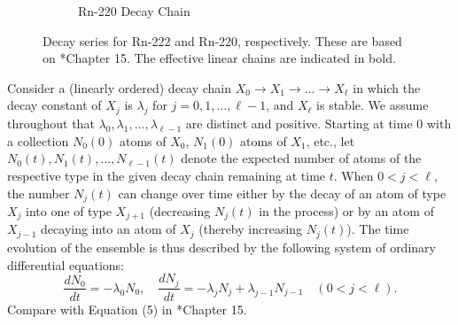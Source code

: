 \documentclass[11pt]{m2pi}
\begin{document}
\begin{figure}[h]
\begin{subfigure}[c]{0.49\textwidth}
{
}
            \caption[]%
            {{\tiny Rn-220 Decay Chain}}    
            \label{fig:ThoriumChain}
        \end{subfigure}
        \caption[ Decay Chains of Isotopes ]
        {\tiny Decay series for Rn-222 and Rn-220, respectively. These are based on \cite{Leighton}*{Chapter 15}. The effective linear chains are indicated in bold. } 
        \label{fig:DecayChains}
\end{figure}

\vspace*{-0.1cm}
Consider a (linearly ordered) decay chain $X_0\to X_1\to \ldots \to X_\ell$ in which the decay constant of $X_j$ is $\lambda_j$ for $j=0,1,\ldots,\ell-1$, and $X_\ell$ is stable.
We assume throughout that $\lambda_0,\lambda_1,\ldots,\lambda_{\ell-1}$ are distinct and positive.
Starting at time $0$ with a collection $N_0(0)$ atoms of $X_0$, $N_1(0)$ atoms of $X_1$, etc.,
let $N_0(t),N_1(t),\ldots,N_{\ell-1}(t)$ denote the expected number of atoms of the respective type in the given decay chain remaining at time $t$.
When $0<j < \ell$, the number $N_j(t)$ can change over time either by the decay of an atom of type $X_j$ into one of type $X_{j+1}$ (decreasing $N_j(t)$ in the process) or by an atom of $X_{j-1}$ decaying into an atom of $X_j$ (thereby increasing $N_j(t)$). The time evolution of the ensemble is thus described by the following system of ordinary differential equations:
$$
\frac{dN_0}{dt}=-\lambda_0 N_0, \quad \frac{dN_j}{dt} = -\lambda_j N_j + \lambda_{j-1}N_{j-1} \quad (0<j < \ell).
$$
Compare with Equation (5) in \cite{Leighton}*{Chapter 15}. \\
\end{document}
